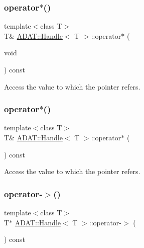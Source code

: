 \subsubsection{\texorpdfstring{operator$\ast$()}{operator*()}\hspace{0.1cm}{\footnotesize\ttfamily [1/2]}}
{\footnotesize\ttfamily template$<$class T$>$ \\
T\& \mbox{\hyperlink{classADAT_1_1Handle}{A\+D\+A\+T\+::\+Handle}}$<$ T $>$\+::operator$\ast$ (\begin{DoxyParamCaption}\item[{void}]{ }\end{DoxyParamCaption}) const\hspace{0.3cm}{\ttfamily [inline]}}



Access the value to which the pointer refers. 

\mbox{\label{classADAT_1_1Handle_a86f851b3a2e8a6084e50bfad306260f4}} 
\subsubsection{\texorpdfstring{operator$\ast$()}{operator*()}\hspace{0.1cm}{\footnotesize\ttfamily [2/2]}}
{\footnotesize\ttfamily template$<$class T$>$ \\
T\& \mbox{\hyperlink{classADAT_1_1Handle}{A\+D\+A\+T\+::\+Handle}}$<$ T $>$\+::operator$\ast$ (\begin{DoxyParamCaption}{ }\end{DoxyParamCaption}) const\hspace{0.3cm}{\ttfamily [inline]}}



Access the value to which the pointer refers. 

\mbox{\label{classADAT_1_1Handle_ad58ef1e032066f7d6b01c2a76cfac5e4}} 
\subsubsection{\texorpdfstring{operator-\/$>$()}{operator->()}\hspace{0.1cm}{\footnotesize\ttfamily [1/2]}}
{\footnotesize\ttfamily template$<$class T$>$ \\
T$\ast$ \mbox{\hyperlink{classADAT_1_1Handle}{A\+D\+A\+T\+::\+Handle}}$<$ T $>$\+::operator-\/$>$ (\begin{DoxyParamCaption}{ }\end{DoxyParamCaption}) const\hspace{0.3cm}{\ttfamily [inline]}}

